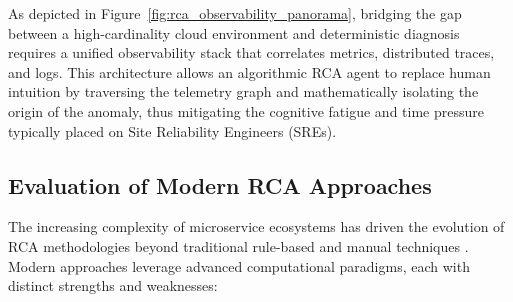 As depicted in Figure~\ref{fig:rca_observability_panorama}, bridging the gap between a high-cardinality cloud environment and deterministic diagnosis requires a unified observability stack that correlates metrics, distributed traces, and logs. This architecture allows an algorithmic RCA agent to replace human intuition by traversing the telemetry graph and mathematically isolating the origin of the anomaly, thus mitigating the cognitive fatigue and time pressure typically placed on Site Reliability Engineers (SREs).

\subsection{Evaluation of Modern RCA Approaches}

The increasing complexity of microservice ecosystems has driven the evolution of RCA methodologies beyond traditional rule-based and manual techniques \cite{barata_2026}. Modern approaches leverage advanced computational paradigms, each with distinct strengths and weaknesses:

